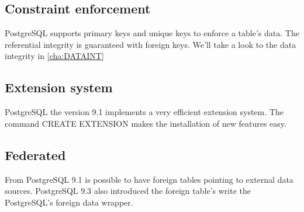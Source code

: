 \subsection{Constraint enforcement}
PostgreSQL supports primary keys and unique keys to enforce a table's data. The referential integrity
is guaranteed with foreign keys. We'll take a look to the data integrity in \ref{cha:DATAINT}

\subsection{Extension system}
PostgreSQL the version 9.1 implements a very efficient extension system. The command CREATE
EXTENSION makes the installation of new features easy.

\subsection{Federated}
From PostgreSQL 9.1 is possible to have foreign tables pointing to external data sources.
PostgreSQL 9.3 also introduced the foreign table's write the PostgreSQL's foreign data
wrapper.
